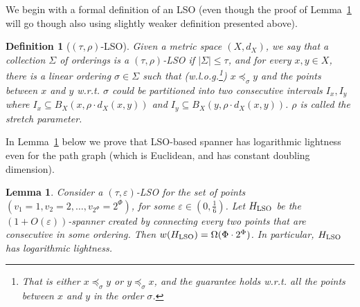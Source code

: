 \documentclass[11pt]{article}
\newtheorem{lemma}[theorem]{Lemma}
\newtheorem{definition}[theorem]{Definition}
\def\eps{\varepsilon}
\begin{document}
We begin with a formal definition of an LSO (even though the proof of Lemma~\ref{lem:LSO} will go though also using slightly weaker definition presented above).
\begin{definition}[$(\tau,\rho)$-LSO]\label{def:LSO}
    Given a metric space $(X,d_{X})$, we say that a collection $\Sigma$
	of orderings is a $(\tau,\rho)$-LSO if
	$\left|\Sigma\right|\le\tau$, and for every $x,y\in X$, there is
	a linear ordering $\sigma\in\Sigma$ such that (w.l.o.g.\footnote{That is either  $x\preceq_{\sigma}y$ or  $y\preceq_{\sigma}x$, and the guarantee holds w.r.t. all the points between $x$ and $y$ in the order $\sigma$.\label{foot:wlogOrder}}) $x\preceq_{\sigma}y$ and the points between $x$ and $y$ w.r.t. $\sigma$ could be partitioned
	into two consecutive intervals $I_{x},I_{y}$ where $I_{x}\subseteq B_{X}(x,\rho\cdot d_{X}(x,y))$	and $I_{y}\subseteq B_{X}(y,\rho\cdot d_{X}(x,y))$. $\rho$ is called the \emph{stretch} parameter. 
\end{definition}
In Lemma~\ref{lem:LSO} below we prove that LSO-based spanner has logarithmic lightness even for the path graph (which is Euclidean, and has constant doubling dimension).
\begin{lemma}\label{lem:LSO}
Consider a $(\tau,\eps)$-LSO for the set of points $\left(v_1=1,v_2=2,\dots,v_{2^\Phi}=2^\Phi\right)$, 
for some $\eps\in(0,\frac{1}{6})$. Let $H_{{\rm LSO}}$ be the $(1+O(\eps))$-spanner
created by connecting every two points that are consecutive in some
ordering. Then $w(H_{{\rm LSO}})=\Omega(\Phi\cdot2^{\Phi})$. In particular,
$H_{{\rm LSO}}$ has logarithmic lightness.
\end{lemma}
\end{document}

